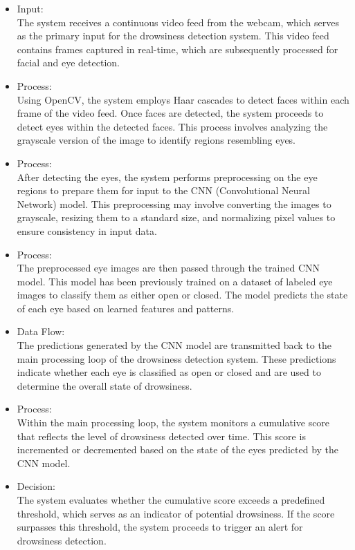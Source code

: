 \documentclass[12pt]{article}
\begin{document}
\begin{itemize}
\item Input: \\ The system receives a continuous video feed from the webcam, which serves as the primary input for the drowsiness detection system. This video feed contains frames captured in real-time, which are subsequently processed for facial and eye detection.\\
\item Process: \\ Using OpenCV, the system employs Haar cascades to detect faces within each frame of the video feed. Once faces are detected, the system proceeds to detect eyes within the detected faces. This process involves analyzing the grayscale version of the image to identify regions resembling eyes.\\
\item Process:\\ After detecting the eyes, the system performs preprocessing on the eye regions to prepare them for input to the CNN (Convolutional Neural Network) model. This preprocessing may involve converting the images to grayscale, resizing them to a standard size, and normalizing pixel values to ensure consistency in input data.\\
\item Process:\\ The preprocessed eye images are then passed through the trained CNN model. This model has been previously trained on a dataset of labeled eye images to classify them as either open or closed. The model predicts the state of each eye based on learned features and patterns.\\
\item Data Flow:\\ The predictions generated by the CNN model are transmitted back to the main processing loop of the drowsiness detection system. These predictions indicate whether each eye is classified as open or closed and are used to determine the overall state of drowsiness.\\
\item Process:\\ Within the main processing loop, the system monitors a cumulative score that reflects the level of drowsiness detected over time. This score is incremented or decremented based on the state of the eyes predicted by the CNN model.\\
\item Decision:\\ The system evaluates whether the cumulative score exceeds a predefined threshold, which serves as an indicator of potential drowsiness. If the score surpasses this threshold, the system proceeds to trigger an alert for drowsiness detection.\\

\end{itemize}
\end{document}
